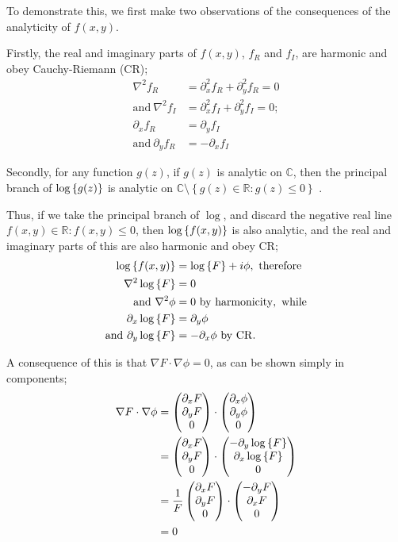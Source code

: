 To demonstrate this, we first make two observations of the consequences of the
analyticity of $f(x,y)$.

Firstly, the real and imaginary parts of $f(x,y)$, $f_R$ and $f_I$, are harmonic
and obey Cauchy-Riemann (CR);
\begin{align}
    \nabla^2 f_R &= \partial_x^2 f_R + \partial_y^2 f_R = 0 \\
    \mathrm{and}~ \nabla^2 f_I &= \partial_x^2 f_I + \partial_y^2 f_I = 0; \\
    \partial_x f_R &= \partial_y f_I \\
    \mathrm{and}~ \partial_y f_R &= - \partial_x f_I
\end{align}

Secondly, for any function $g(z)$, if $g(z)$ is analytic on $\mathbb{C}$, then the
principal branch of $\log \left\{ g(z) \right\}$ is analytic on $\mathbb{C} \setminus \left\{
g(z) \in \mathbb{R} : g(z) \le 0 \right\}$ \cite{laptev,o-farrill}.

Thus, if we take the principal branch of $\log$, and discard the negative real
line $f(x,y) \in \mathbb{R}:f(x,y) \le 0$, then $\log \left\{ f(x,y) \right\}$ is also
analytic, and the real and imaginary parts of this are also harmonic and obey
CR;
\begin{align}
    \log \left\{ f(x,y) \right\} &= \log \left\{ F \right\} + i \phi, ~\mathrm{therefore} \\
    \nabla^2 \log \left\{ F \right\} &= 0 \\
    \mathrm{and}~ \nabla^2 \phi &= 0 ~\mathrm{by~harmonicity,~while} \\
    \partial_x \log \left\{ F \right\} &= \partial_y \phi
    \label{eqn:log-cr-1} \\
    \mathrm{and}~ \partial_y \log \left\{ F \right\} &= - \partial_x \phi ~\mathrm{by~CR}.
    \label{eqn:log-cr-2}
\end{align}

A consequence of this is that $\nabla F \cdot \nabla \phi = 0$, as can be
shown simply in components;
\begin{align}
    \nabla F \cdot \nabla \phi
        &= \begin{pmatrix} \partial_x F \\ \partial_y F \\ 0 \end{pmatrix} \cdot
        \begin{pmatrix} \partial_x \phi \\ \partial_y \phi \\ 0 \end{pmatrix} \\
        &= \begin{pmatrix} \partial_x F \\ \partial_y F \\ 0 \end{pmatrix} \cdot
        \begin{pmatrix} - \partial_y \log \left\{ F \right\} \\ \partial_x \log \left\{ F \right\} \\ 0 \end{pmatrix} \\
        &= \frac{1}{F} \begin{pmatrix} \partial_x F \\ \partial_y F \\ 0 \end{pmatrix} \cdot
        \begin{pmatrix} - \partial_y F \\ \partial_x F \\ 0 \end{pmatrix} \\
        &= 0
\end{align}


